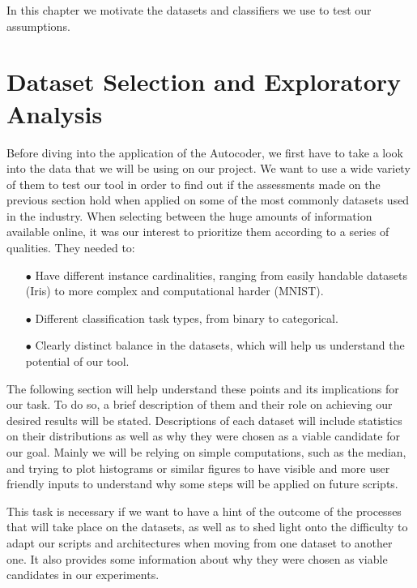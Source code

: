 In this chapter we motivate the datasets and classifiers we use to test our assumptions. 

\section{Dataset Selection and Exploratory Analysis}

Before diving into the application of the Autocoder, we first have to take a look into the data that we will be using on our project. We want to use a wide variety of them to test our tool in order to find out if the assessments made on the previous section hold when applied on some of the most commonly datasets used in the industry. When selecting between the huge amounts of information available online, it was our interest to prioritize them according to a series of qualities. They needed to:
 
\begin{itemize}
	
\item[$\bullet$] Have different instance cardinalities, ranging from easily handable datasets (Iris) to more complex and computational harder (MNIST).

\item[$\bullet$] Different classification task types, from binary to categorical.

\item[$\bullet$] Clearly distinct balance in the datasets, which will help us understand the potential of our tool.

\end{itemize}

The following section will help understand these points and its implications for our task. To do so, a brief description of them and their role on achieving our desired results will be stated. Descriptions of each dataset will include statistics on their distributions as well as why they were chosen as a viable candidate for our goal. Mainly we will be relying on simple computations, such as the median, and trying to plot histograms or similar figures to have visible and more user friendly inputs to understand why some steps will be applied on future scripts.\par
 
This task is necessary if we want to have a hint of the outcome of the processes that will take place on the datasets, as well as to shed  light onto the difficulty to adapt our scripts and architectures when moving from one dataset to another one. It also provides some information about why they were chosen as viable candidates in our experiments.

